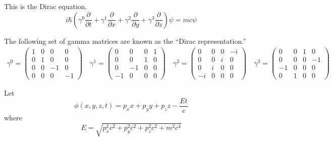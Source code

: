 \documentclass[12pt]{article}
\begin{document}
\noindent
This is the Dirac equation.
\begin{equation*}
i\hbar\left(
\gamma^0\frac{\partial}{\partial t}+
\gamma^1\frac{\partial}{\partial x}+
\gamma^2\frac{\partial}{\partial y}+
\gamma^3\frac{\partial}{\partial z}
\right)\psi
=mc\psi
\end{equation*}

\noindent
The following set of gamma matrices are known as the ``Dirac representation.''
{\small
\begin{gather*}
\gamma^0=\begin{pmatrix}1&0&0&0\\0&1&0&0\\0&0&-1&0\\0&0&0&-1\end{pmatrix}\quad
\gamma^1=\begin{pmatrix}0&0&0&1\\0&0&1&0\\0&-1&0&0\\-1&0&0&0\end{pmatrix}\quad
\gamma^2=\begin{pmatrix}0&0&0&-i\\0&0&i&0\\0&i&0&0\\-i&0&0&0\end{pmatrix}\quad
\gamma^3=\begin{pmatrix}0&0&1&0\\0&0&0&-1\\-1&0&0&0\\0&1&0&0\end{pmatrix}
\end{gather*}
}

\noindent
Let
\begin{equation*}
\phi(x,y,z,t)=p_xx+p_yy+p_zz-\frac{Et}{c}
\end{equation*}
where
\begin{equation*}
E=\sqrt{p_x^2c^2+p_y^2c^2+p_z^2c^2+m^2c^4}
\end{equation*}
\end{document}
